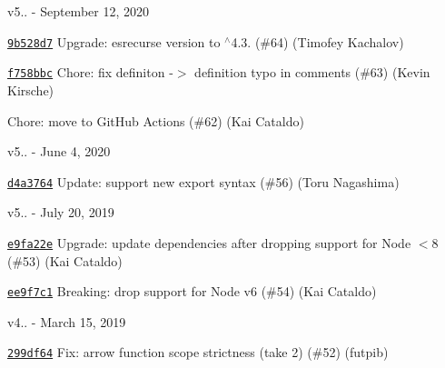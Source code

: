 v5.. -\/ September 12, 2020


\begin{DoxyItemize}
\item \href{https://github.com/eslint/eslint-scope/commit/9b528d778c381718c12dabfb7f1c0e0dc6b36e49}{\texttt{ {\ttfamily 9b528d7}}} Upgrade\+: esrecurse version to $^\wedge$4.3. (\#64) (Timofey Kachalov)
\item \href{https://github.com/eslint/eslint-scope/commit/f758bbc3d49b9b9ea2289a5d6a6bba8dcf2c4903}{\texttt{ {\ttfamily f758bbc}}} Chore\+: fix definiton -\/\texorpdfstring{$>$}{>} definition typo in comments (\#63) (Kevin Kirsche)
\item \href{https://github.com/eslint/eslint-scope/commit/751373473375b3f2edc4eaf1c8d2763d8435bb72}{\texttt{ {}}} Chore\+: move to Git\+Hub Actions (\#62) (Kai Cataldo)
\end{DoxyItemize}

v5.. -\/ June 4, 2020


\begin{DoxyItemize}
\item \href{https://github.com/eslint/eslint-scope/commit/d4a376434b16289c1a428d7e304576e997520873}{\texttt{ {\ttfamily d4a3764}}} Update\+: support new export syntax (\#56) (Toru Nagashima)
\end{DoxyItemize}

v5.. -\/ July 20, 2019


\begin{DoxyItemize}
\item \href{https://github.com/eslint/eslint-scope/commit/e9fa22ea412c26cf2761fa98af7e715644bdb464}{\texttt{ {\ttfamily e9fa22e}}} Upgrade\+: update dependencies after dropping support for Node \texorpdfstring{$<$}{<}8 (\#53) (Kai Cataldo)
\item \href{https://github.com/eslint/eslint-scope/commit/ee9f7c12721aa195ba7e0e69551f49bfdb479951}{\texttt{ {\ttfamily ee9f7c1}}} Breaking\+: drop support for Node v6 (\#54) (Kai Cataldo)
\end{DoxyItemize}

v4.. -\/ March 15, 2019


\begin{DoxyItemize}
\item \href{https://github.com/eslint/eslint-scope/commit/299df64bdafb30b4d9372e4b7af0cf51a3818c4a}{\texttt{ {\ttfamily 299df64}}} Fix\+: arrow function scope strictness (take 2) (\#52) (futpib)
\end{DoxyItemize}

